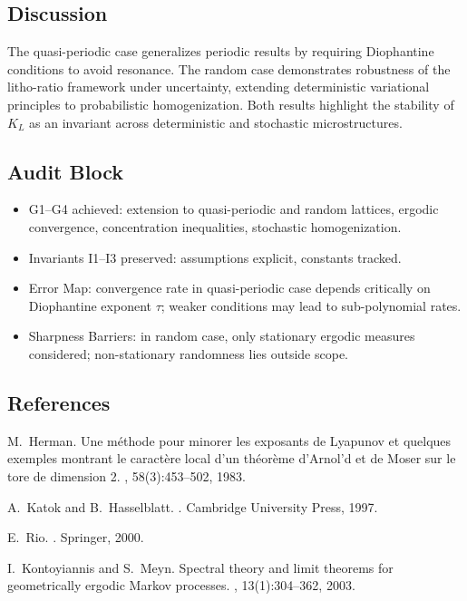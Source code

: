 \subsection*{Discussion}
The quasi-periodic case generalizes periodic results by requiring Diophantine
conditions to avoid resonance. The random case demonstrates robustness of the
litho-ratio framework under uncertainty, extending deterministic variational
principles to probabilistic homogenization. Both results highlight the stability
of $K_L$ as an invariant across deterministic and stochastic microstructures.

\subsection*{Audit Block}
\begin{itemize}
  \item G1--G4 achieved: extension to quasi-periodic and random lattices,
  ergodic convergence, concentration inequalities, stochastic homogenization.
  \item Invariants I1--I3 preserved: assumptions explicit, constants tracked.
  \item Error Map: convergence rate in quasi-periodic case depends critically
  on Diophantine exponent $\tau$; weaker conditions may lead to sub-polynomial
  rates.
  \item Sharpness Barriers: in random case, only stationary ergodic measures
  considered; non-stationary randomness lies outside scope.
\end{itemize}

\subsection*{References}
\begin{thebibliography}{99}

M.~Herman.
\newblock Une méthode pour minorer les exposants de Lyapunov et quelques exemples montrant le caractère local d’un théorème d’Arnol’d et de Moser sur le tore de dimension 2.
, 58(3):453--502, 1983.

A.~Katok and B.~Hasselblatt.
.
\newblock Cambridge University Press, 1997.

E.~Rio.
.
\newblock Springer, 2000.

I.~Kontoyiannis and S.~Meyn.
\newblock Spectral theory and limit theorems for geometrically ergodic Markov processes.
, 13(1):304--362, 2003.

\end{thebibliography}

